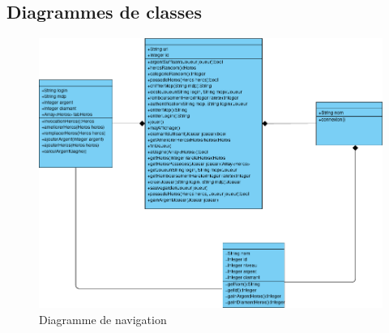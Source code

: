 \subsection{Diagrammes de classes}

    \begin{figure}[ht!]
        \centering
            \includegraphics[width=1\textwidth]{images/Diagramme_de_classe_TW2_V4.png}
        \caption{Diagramme de navigation}
    \end{figure}
